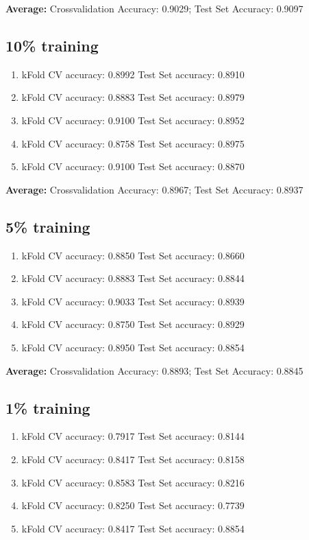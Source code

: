 \documentclass{article}
\begin{document}
	\textbf{Average:} Crossvalidation Accuracy: 0.9029;  Test Set Accuracy: 0.9097

	\subsection{10\% training}
	\begin{enumerate}
		\item kFold CV accuracy: 0.8992  \indent Test Set accuracy: 0.8910
		\item kFold CV accuracy: 0.8883  \indent Test Set accuracy: 0.8979
		\item kFold CV accuracy: 0.9100  \indent Test Set accuracy: 0.8952
		\item kFold CV accuracy: 0.8758  \indent Test Set accuracy: 0.8975
		\item kFold CV accuracy: 0.9100  \indent Test Set accuracy: 0.8870
	\end{enumerate}

	\textbf{Average:} Crossvalidation Accuracy: 0.8967;  Test Set Accuracy: 0.8937

	\subsection{5\% training}
	\begin{enumerate}
		\item kFold CV accuracy: 0.8850  \indent Test Set accuracy: 0.8660
		\item kFold CV accuracy: 0.8883  \indent Test Set accuracy: 0.8844
		\item kFold CV accuracy: 0.9033  \indent Test Set accuracy: 0.8939
		\item kFold CV accuracy: 0.8750  \indent Test Set accuracy: 0.8929
		\item kFold CV accuracy: 0.8950  \indent Test Set accuracy: 0.8854
	\end{enumerate}

	\textbf{Average:} Crossvalidation Accuracy: 0.8893;  Test Set Accuracy: 0.8845

	\subsection{1\% training}
	\begin{enumerate}
		\item kFold CV accuracy: 0.7917  \indent Test Set accuracy: 0.8144
		\item kFold CV accuracy: 0.8417  \indent Test Set accuracy: 0.8158
		\item kFold CV accuracy: 0.8583  \indent Test Set accuracy: 0.8216
		\item kFold CV accuracy: 0.8250  \indent Test Set accuracy: 0.7739
		\item kFold CV accuracy: 0.8417  \indent Test Set accuracy: 0.8854
	\end{enumerate}
\end{document}
